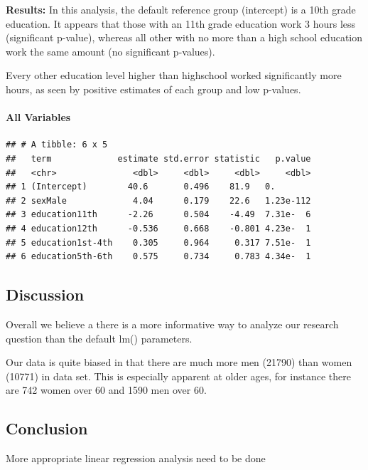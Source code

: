 \documentclass[]{article}
\let\oldparagraph\paragraph
\renewcommand{\paragraph}[1]{\oldparagraph{#1}\mbox{}}
\begin{document}
\textbf{Results:} In this analysis, the default reference group
(intercept) is a 10th grade education. It appears that those with an
11th grade education work 3 hours less (significant p-value), whereas
all other with no more than a high school education work the same amount
(no significant p-values).

Every other education level higher than highschool worked significantly
more hours, as seen by positive estimates of each group and low
p-values.

\hypertarget{all-variables}{%
\paragraph{All Variables}\label{all-variables}}

\begin{verbatim}
## # A tibble: 6 x 5
##   term             estimate std.error statistic   p.value
##   <chr>               <dbl>     <dbl>     <dbl>     <dbl>
## 1 (Intercept)        40.6       0.496    81.9   0.       
## 2 sexMale             4.04      0.179    22.6   1.23e-112
## 3 education11th      -2.26      0.504    -4.49  7.31e-  6
## 4 education12th      -0.536     0.668    -0.801 4.23e-  1
## 5 education1st-4th    0.305     0.964     0.317 7.51e-  1
## 6 education5th-6th    0.575     0.734     0.783 4.34e-  1
\end{verbatim}

\hypertarget{discussion}{%
\subsection{Discussion}\label{discussion}}

Overall we believe a there is a more informative way to analyze our
research question than the default lm() parameters.

Our data is quite biased in that there are much more men (21790) than
women (10771) in data set. This is especially apparent at older ages,
for instance there are 742 women over 60 and 1590 men over 60.

\hypertarget{conclusion}{%
\subsection{Conclusion}\label{conclusion}}

More appropriate linear regression analysis need to be done
\end{document}
